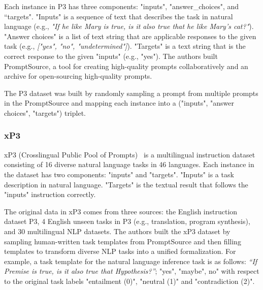 \documentclass[11pt]{article}
\begin{document}
Each instance in P3 has
three components: 
 "inputs", "answer\_choices", and “targets". "Inputs" is a sequence of text that describes the task in natural language (e.g., \textit{"If he like Mary is true, is it also true that he like Mary's cat?"}). 
"Answer choices" is a list of text string that are applicable responses to the given task (e.g., \textit{["yes", "no", "undetermined"]}). "Targets" is a text string that is the correct response to the given "inputs" (e.g., "yes"). 
The authors built PromptSource, a tool for creating high-quality prompts collaboratively and an archive for open-sourcing high-quality prompts. 

The P3 dataset was built by randomly sampling a prompt from multiple prompts in the PromptSource and mapping each instance into a ("inputs", "answer choices", "targets") triplet.

\subsubsection{xP3}
xP3 (Crosslingual Public Pool of Prompts)~\citep{muennighoff2022crosslingual} is a multilingual instruction dataset consisting of 16 diverse natural language tasks in 46 languages. Each instance in the dataset has two components: "inputs" and "targets". "Inputs" is a task description in natural language. "Targets" is the textual result that follows the "inputs" instruction correctly. 

The original data in xP3 comes from three sources: the English instruction dataset P3, 4 English unseen tasks in P3 (e.g., translation, program synthesis), and 30 multilingual NLP datasets. 
The authors built the xP3 dataset by sampling human-written task templates from PromptSource and then filling templates to transform diverse NLP tasks into a unified formalization. For example, a task template for the natural language inference task is as follows: \textit{“If {Premise} is true, is it also true that {Hypothesis}?”}; "yes", "maybe", no" with respect to the original task labels "entailment (0)", "neutral (1)" and "contradiction (2)". 
\end{document}
